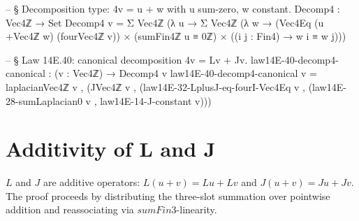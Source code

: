 \documentclass[11pt,a4paper]{book}
\def\mathrm#1{#1}%
\def\texorpdfstring#1#2{#2}%
\begin{document}
\begin{code}
-- § Decomposition type: 4v = u + w with u sum-zero, w constant.
Decomp4 : Vec4ℤ → Set
Decomp4 v =
  Σ Vec4ℤ (λ u →
    Σ Vec4ℤ (λ w →
      (Vec4Eq (u +Vec4ℤ w) (fourVec4ℤ v)) ×
      (sumFin4ℤ u ≡ 0ℤ) ×
      ((i j : Fin4) → w i ≡ w j)))

-- § Law 14E.40: canonical decomposition 4v = Lv + Jv.
law14E-40-decomp4-canonical : (v : Vec4ℤ) → Decomp4 v
law14E-40-decomp4-canonical v =
  laplacianVec4ℤ v ,
  (JVec4ℤ v ,
    (law14E-32-LplusJ-eq-fourI-Vec4Eq v ,
     (law14E-28-sumLaplacian0 v ,
      law14E-14-J-constant v)))
\end{code}

\section{Additivity of \texorpdfstring{$L$}{L} and \texorpdfstring{$J$}{J}}

$L$ and $J$ are additive operators: $L(u + v) = Lu + Lv$ and $J(u + v) = Ju + Jv$.
The proof proceeds by distributing the three-slot summation over pointwise addition and reassociating via $\mathrm{sumFin3}$-linearity.
\end{document}
